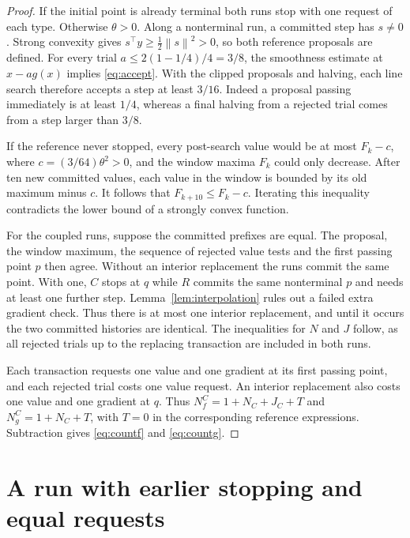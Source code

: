 \documentclass[11pt]{article}
\newcommand{\norm}[1]{\left\lVert#1\right\rVert}
\begin{document}
\begin{proof}
If the initial point is already terminal both runs stop with one
request of each type. Otherwise \(\theta>0\). Along a nonterminal
run, a committed step has \(s\ne0\). Strong convexity gives
\(s^\top y\ge \tfrac12\norm{s}^2>0\), so both reference proposals
are defined. For every trial
\(a\le 2(1-1/4)/4=3/8\), the smoothness estimate at \(x-a g(x)\)
implies \eqref{eq:accept}. With the clipped proposals and
halving, each line search therefore accepts a step at least
\(3/16\). Indeed a proposal passing immediately is at least \(1/4\),
whereas a final halving from a rejected trial comes from a step
larger than \(3/8\).

If the reference never stopped, every post-search value would be at
most \(F_k-c\), where \(c=(3/64)\theta^2>0\), and the window maxima
\(F_k\) could only decrease. After ten new committed values, each
value in the window is bounded by its old maximum minus \(c\).
It follows that \(F_{k+10}\le F_k-c\). Iterating this inequality
contradicts the lower bound of a strongly convex function.

For the coupled runs, suppose the committed prefixes are equal.
The proposal, the window maximum, the sequence of rejected value
tests and the first passing point \(p\) then agree. Without an
interior replacement the runs commit the same point. With one,
\(C\) stops at \(q\) while \(R\) commits the same nonterminal \(p\)
and needs at least one further step. Lemma~\ref{lem:interpolation}
rules out a failed extra gradient check. Thus there is at most one
interior replacement, and until it occurs the two committed
histories are identical. The inequalities for \(N\) and \(J\)
follow, as all rejected trials up to the replacing transaction
are included in both runs.

Each transaction requests one value and one gradient at its first
passing point, and each rejected trial costs one value request.
An interior replacement also costs one value and one gradient at
\(q\). Thus \(N_f^C=1+N_C+J_C+T\) and
\(N_g^C=1+N_C+T\), with \(T=0\) in the corresponding reference
expressions. Subtraction gives \eqref{eq:countf} and \eqref{eq:countg}.
\end{proof}

\section{A run with earlier stopping and equal requests}
\end{document}
